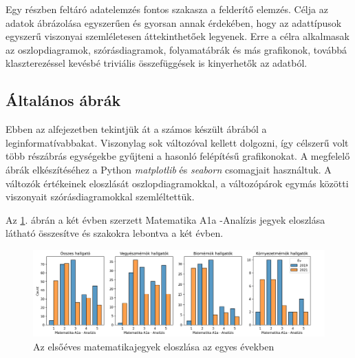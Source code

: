 \documentclass[12pt]{article}
\begin{document}
Egy részben feltáró adatelemzés fontos szakasza a felderítő elemzés. Célja az adatok ábrázolása egyszerűen és gyorsan annak érdekében, hogy az adattípusok egyszerű viszonyai szemléletesen áttekinthetőek legyenek. Erre a célra alkalmasak az oszlopdiagramok, szórásdiagramok, folyamatábrák és más grafikonok, továbbá klaszterezéssel kevésbé triviális összefüggések is kinyerhetők az adatból.

\subsection{Általános ábrák}
\label{ssec:altalanos}

Ebben az alfejezetben tekintjük át a számos készült ábrából a leginformatívabbakat. Viszonylag sok változóval kellett dolgozni, így célszerű volt több részábrás egységekbe gyűjteni a hasonló felépítésű grafikonokat. A megfelelő ábrák elkészítéséhez a Python \emph{matplotlib} és \emph{seaborn} csomagjait használtuk. A változók értékeinek eloszlását oszlopdiagramokkal, a változópárok egymás közötti viszonyait szórásdiagramokkal szemléltettük.



Az \ref{fig:jegyeloszlas}. ábrán a két évben szerzett Matematika A1a -Analízis jegyek eloszlása látható összesítve és szakokra lebontva a két évben. 



\begin{figure}[H] 
\centering
\includegraphics[width=\textwidth]{kepek/jegyek_eloszlas2.png}
\caption{Az elsőéves matematikajegyek eloszlása az egyes években}
\label{fig:jegyeloszlas}
\end{figure} 
\end{document}
